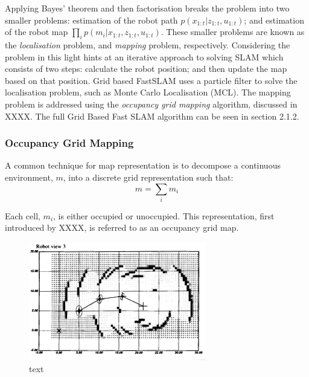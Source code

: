 \documentclass[a4paper]{article}
\begin{document}
Applying Bayes' theorem and then factorisation breaks the problem into two smaller problems: estimation of the robot path $p(x_{1:t} | z_{1:t}, u_{1:t})$; and estimation of the robot map $\prod_{i}p(m_i | x_{1:t}, z_{1:t}, u_{1:t})$. These smaller problems are known as the \textit{localisation} problem, and \textit{mapping} problem, respectively. Considering the problem in this light hints at an iterative approach to solving SLAM which consists of two steps: calculate the robot position; and then update the map based on that position. Grid based FastSLAM uses a particle filter to solve the localisation problem, such as Monte Carlo Localisation (MCL). The mapping problem is addressed using the \textit{occupancy grid mapping} algorithm, discussed in XXXX. The full Grid Based Fast SLAM algorithm can be seen in section 2.1.2.


\subsubsection{Occupancy Grid Mapping}
A common technique for map representation is to decompose a continuous environment, $m$, into a discrete grid representation such that:
\begin{equation}
m = \sum_{i} m_i
\end{equation}

Each cell, $m_i$, is either occupied or unoccupied. This representation, first introduced by XXXX, is referred to as an occupancy grid map.
\begin{figure}[h]
\centering
\includegraphics[scale=0.8]{occupancy_grid}
\caption{text}
\end{figure}
\end{document}
